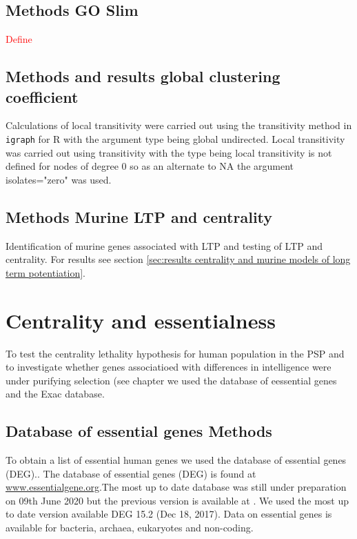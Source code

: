 

\subsection{Methods GO Slim}
\textcolor{red}{Define}

\subsection{Methods and results global clustering coefficient}
Calculations of local transitivity were carried out using the transitivity method in \texttt{igraph} for R with the argument type being global undirected. Local transitivity was carried out using transitivity with the type being local transitivity is not defined for nodes of degree 0 so as an alternate to NA the argument isolates="zero" was used. 

\subsection{Methods Murine LTP and centrality}
Identification of murine genes associated with LTP and testing of LTP and centrality. For results see section \ref{sec:results centrality and murine models of long term potentiation}.


\section{Centrality and essentialness}
To test the centrality lethality hypothesis for human population in the PSP and to investigate whether genes associatioed with differences in intelligence were under purifying selection (see chapter  we used the database of eessential genes and the Exac database. 

\subsection{Database of essential genes Methods}
 \label{sec:Database of essential genes}
 
 To obtain a list of essential human genes we used the database of essential genes (DEG).\cite{luo2014deg}. The database of essential genes (DEG) is found at \url{www.essentialgene.org}.The most up to date database was still under preparation on 09th June 2020 but the previous version is available at \cite{ http://tubic.org/deg_bak/}. We used the most up to date version available DEG 15.2 (Dec 18, 2017). Data on essential genes is available for bacteria, archaea, eukaryotes and non-coding.
 
